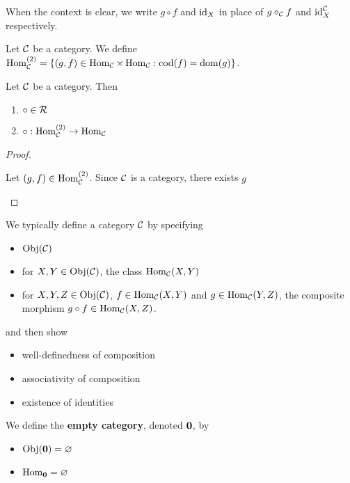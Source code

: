 \documentclass{book}
\begin{document}
	\begin{note}
		When the context is clear, we write $g \circ f$ and $\operatorname{id}_X$ in place of $g \circ_{\mathcal{C}} f $ and $\operatorname{id}^{\mathcal{C}}_{X}$ respectively.
	\end{note}

	\begin{defn}
		Let $\mathcal{C}$ be a category. We define $\operatorname{Hom}_{\mathcal{C}}^{(2)} = \{(g,f) \in \operatorname{Hom}_{\mathcal{C}} \times \operatorname{Hom}_{\mathcal{C}} : \operatorname{cod}(f) = \operatorname{dom}(g) \}$.
	\end{defn}

	\begin{ex}
		Let $\mathcal{C}$ be a category. Then 
		\begin{enumerate}
			\item $\circ \in \mathcal{R}$
			\item $\circ: \operatorname{Hom}_{\mathcal{C}}^{(2)} \rightarrow \operatorname{Hom}_{\mathcal{C}}$
		\end{enumerate}
	\end{ex}

	\begin{proof}
		\begin{itemize}
			Let $(g, f ) \in \operatorname{Hom}_{\mathcal{C}}^{(2)}$. Since $\mathcal{C}$ is a category, there exists $g$
		\end{itemize}
	\end{proof}

	\begin{note} 
		We typically define a category $\mathcal{C}$ by specifying 
		\begin{itemize}
			\item $\operatorname{Obj}(\mathcal{C})$
			\item for $X,Y \in \operatorname{Obj}(\mathcal{C})$, the class $\operatorname{Hom}_{\mathcal{C}}(X, Y)$
			\item for $X,Y,Z \in \operatorname{Obj}(\mathcal{C})$, $f \in \operatorname{Hom}_{\mathcal{C}}(X, Y)$ and $g \in \operatorname{Hom}_{\mathcal{C}}(Y, Z)$, the composite morphism $g \circ f \in \operatorname{Hom}_{\mathcal{C}}(X,Z)$.
		\end{itemize}
		and then show 
		\begin{itemize}
			\item well-definedness of composition
			\item associativity of composition 
			\item existence of identities 
		\end{itemize}
	\end{note}

	\begin{defn} 
		We define the \textbf{empty category}, denoted $\operatorname*{\mathbf{0}}$, by 
		\begin{itemize}
			\item $\operatorname{Obj}(\operatorname*{\mathbf{0}}) = \varnothing$
			\item $\operatorname{Hom}_{\operatorname*{\mathbf{0}}} = \varnothing$
		\end{itemize}
	\end{defn}
\end{document}
